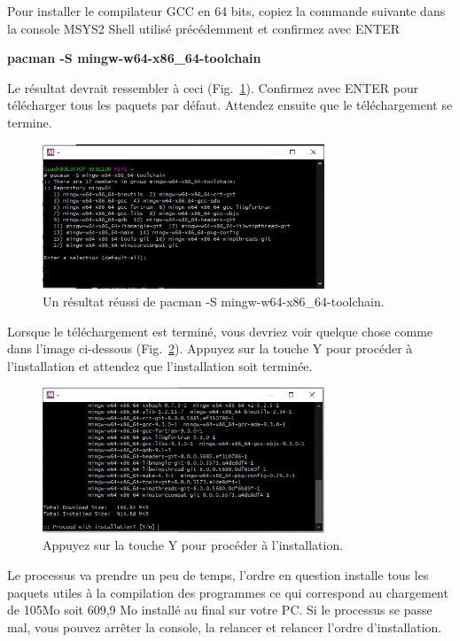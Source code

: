 \documentclass{article}
\newcommand\fig[1]{{Fig.~\ref{#1}}}
\begin{document}
Pour installer le compilateur GCC en 64 bits, copiez la commande suivante dans la console MSYS2 Shell utilisé précédemment et confirmez avec ENTER 
\begin{tcolorbox}[width=\textwidth,colframe=Purple,colback={black},title={Ceci est la console MSYS2 Shell},outer arc=0mm,colupper=white]    
      \large\textbf{pacman -S mingw-w64-x86\_64-toolchain}
\end{tcolorbox}
Le résultat devrait ressembler à ceci (\fig{F:GNUInstall1}). Confirmez avec ENTER pour télécharger tous les paquets par défaut. Attendez ensuite que le téléchargement se termine.
\begin{figure}[H]
\center
\includegraphics[width=0.75\textwidth]{Plots/Msys2_11GNU.jpeg}
\caption{Un résultat réussi de pacman -S mingw-w64-x86\_64-toolchain.\label{F:GNUInstall1}}
\end{figure}
Lorsque le téléchargement est terminé, vous devriez voir quelque chose comme dans l'image ci-dessous (\fig{F:GNUInstall2}). Appuyez sur la touche Y pour procéder à l'installation et attendez que l'installation soit terminée.
\begin{figure}[H]
\center
\includegraphics[width=0.75\textwidth]{Plots/Msys2_12Gnu.jpg}
\caption{Appuyez sur la touche Y pour procéder à l'installation.\label{F:GNUInstall2}}
\end{figure}
Le processus va prendre un peu de temps, l'ordre en question installe tous les paquets utiles à la compilation des programmes ce qui correspond au chargement de 105Mo soit 609,9 Mo installé au final sur votre PC. Si le processus se passe mal, vous pouvez arrêter la console, la relancer et relancer l'ordre d'installation.
\end{document}
